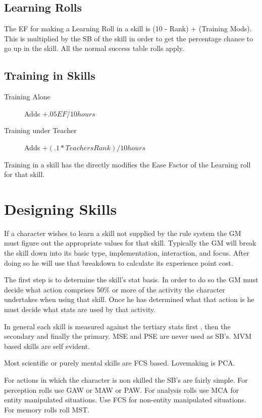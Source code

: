 \subsection{Learning Rolls}

The EF for making a Learning Roll in a skill is (10 - Rank) + (Training
Mods). This is multiplied by the SB of the skill in order to get the
percentage chance to go up in the skill. All the normal success table rolls
apply.

\subsection{Training in Skills}

\begin{description}
	\item[Training Alone]
	Adds \(+.05 EF/10 hours\)
	\item[Training under Teacher]
	Adds \(+(.1 * Teachers Rank)/10 hours\)
\end{description}

Training in a skill has the directly modifies the Ease Factor of the 
Learning roll for that skill.

\section{Designing Skills}

If a character wishes to learn a skill not supplied by the rule 
system the GM must figure out the appropriate values for that skill. 
Typically the GM will break the skill down into its basic type, 
implementation, interaction, and focus. After doing so he will use 
that breakdown to calculate its experience point cost.

The first step is to determine the skill's stat basis. In order to do 
so the GM must decide what action comprises 50\% or more of the activity
the character undertakes when using that skill. Once he has determined 
what that action is he must decide what stats are used by that activity.

In general each skill is measured against the tertiary stats first , then the 
secondary and finally the primary. MSE and PSE are never used as SB's.
MVM based skills are self evident. 

Most scientific or purely mental skills are FCS based.
Lovemaking is PCA.

For actions in which the character is non skilled the SB's are fairly
simple. For perception rolls use GAW or MAW or PAW. For analysis rolls use
MCA for entity manipulated situations. Use FCS for non-entity
manipulated situations. For memory rolls roll MST. 

